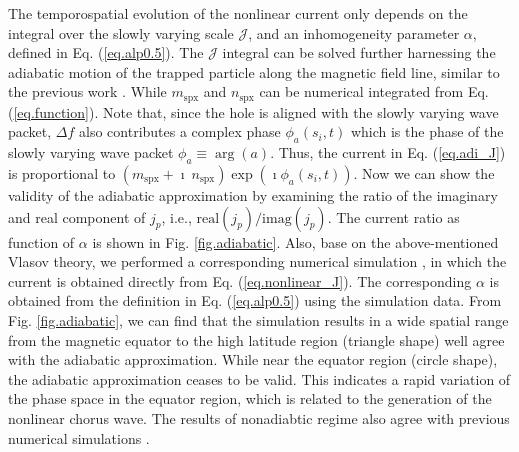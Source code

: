 The temporospatial evolution of the nonlinear current only depends on the integral over the slowly varying scale $\mathcal{J}$, and an inhomogeneity parameter $\alpha$, defined in Eq. (\ref{eq.alp0.5}). 
The $\mathcal{J}$ integral can be solved further harnessing the adiabatic motion of the trapped particle along the magnetic field line, similar to the previous work \cite{summers2012}. While $m_\mathrm{spx}$ and $n_\mathrm{spx}$ can be numerical integrated from Eq. (\ref{eq.function}).
Note that, since the hole is aligned with the slowly varying wave packet,  $\Delta f$ also contributes a complex phase $\phi_a(s_i,t)$ which is the phase of the slowly varying wave packet $\phi_a \equiv \arg(a)$.
Thus, the current in Eq. (\ref{eq.adi_J}) is proportional to $(m_\mathrm{s p x}+\imath ~ n_\mathrm{s p x}) \exp({\imath \phi_a(s_i,t)})$.
Now we can show the validity of the adiabatic approximation by examining the ratio of the imaginary and real component of $j_p$, i.e., $\mathrm{real}(j_p)/\mathrm{imag}(j_p)$.
The current ratio as function of $\alpha$ is shown in Fig. \ref{fig.adiabatic}.
Also, base on the above-mentioned Vlasov theory, we performed a corresponding numerical simulation \cite{zheng2023b}, in which the current is obtained directly from Eq. (\ref{eq.nonlinear_J}).
The corresponding $\alpha$ is obtained from the definition in Eq. (\ref{eq.alp0.5}) using the simulation data.
From Fig. \ref{fig.adiabatic}, we can find that the simulation results in a wide spatial range from the magnetic equator to the high latitude region (triangle shape) well agree with the adiabatic approximation.
While near the equator region (circle shape), the adiabatic approximation ceases to be valid. 
This indicates a rapid variation of the phase space in the equator region, which is related to the generation of the nonlinear chorus wave. The results of nonadiabtic regime also agree with previous numerical simulations \cite{tao2017a,tao2017b}.